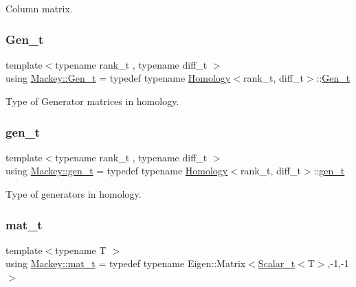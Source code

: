 Column matrix. 

\mbox{\label{namespaceMackey_a5048063727afe2ed842d6bff76cef28e}} 
\subsubsection{\texorpdfstring{Gen\+\_\+t}{Gen\_t}}
{\footnotesize\ttfamily template$<$typename rank\+\_\+t , typename diff\+\_\+t $>$ \\
using \hyperlink{namespaceMackey_a5048063727afe2ed842d6bff76cef28e}{Mackey\+::\+Gen\+\_\+t} = typedef typename \hyperlink{classMackey_1_1Homology}{Homology}$<$rank\+\_\+t, diff\+\_\+t$>$\+::\hyperlink{namespaceMackey_a5048063727afe2ed842d6bff76cef28e}{Gen\+\_\+t}}



Type of Generator matrices in homology. 

\mbox{\label{namespaceMackey_a6bb0b2796632ba6c7f8ea192f7aecffe}} 
\subsubsection{\texorpdfstring{gen\+\_\+t}{gen\_t}}
{\footnotesize\ttfamily template$<$typename rank\+\_\+t , typename diff\+\_\+t $>$ \\
using \hyperlink{namespaceMackey_a6bb0b2796632ba6c7f8ea192f7aecffe}{Mackey\+::gen\+\_\+t} = typedef typename \hyperlink{classMackey_1_1Homology}{Homology}$<$rank\+\_\+t, diff\+\_\+t$>$\+::\hyperlink{namespaceMackey_a6bb0b2796632ba6c7f8ea192f7aecffe}{gen\+\_\+t}}



Type of generators in homology. 

\mbox{\label{namespaceMackey_a035386035757dade630f685e508e5cf9}} 
\subsubsection{\texorpdfstring{mat\+\_\+t}{mat\_t}}
{\footnotesize\ttfamily template$<$typename T $>$ \\
using \hyperlink{namespaceMackey_a035386035757dade630f685e508e5cf9}{Mackey\+::mat\+\_\+t} = typedef typename Eigen\+::\+Matrix$<$\hyperlink{namespaceMackey_a93ba297573961f91101fb84bc84bbe95}{Scalar\+\_\+t}$<$T$>$,-\/1,-\/1$>$}



